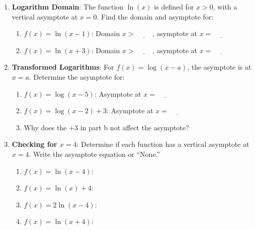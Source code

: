 \documentclass[12pt]{article}
\begin{document}
\begin{enumerate}[label=2.\arabic*]
    \item \textbf{Logarithm Domain}: The function \( \ln(x) \) is defined for \( x > 0 \), with a vertical asymptote at \( x = 0 \). Find the domain and asymptote for:
    \begin{enumerate}[label=\alph*)]
        \item \( f(x) = \ln(x - 1) \): Domain \( x > \underline{\hspace{1cm}} \), asymptote at \( x = \underline{\hspace{1cm}} \)
        \item \( f(x) = \ln(x + 3) \): Domain \( x > \underline{\hspace{1cm}} \), asymptote at \( x = \underline{\hspace{1cm}} \)
    \end{enumerate}
    \item \textbf{Transformed Logarithms}: For \( f(x) = \log(x - a) \), the asymptote is at \( x = a \). Determine the asymptote for:
    \begin{enumerate}[label=\alph*)]
        \item \( f(x) = \log(x - 5) \): Asymptote at \( x = \underline{\hspace{1cm}} \)
        \item \( f(x) = \log(x - 2) + 3 \): Asymptote at \( x = \underline{\hspace{1cm}} \)
        \item Why does the \( +3 \) in part b not affect the asymptote? \underline{\hspace{6cm}}
    \end{enumerate}
    \item \textbf{Checking for \( x = 4 \)}: Determine if each function has a vertical asymptote at \( x = 4 \). Write the asymptote equation or “None.”
    \begin{enumerate}[label=\alph*)]
        \item \( f(x) = \ln(x - 4) \): \underline{\hspace{2cm}}
        \item \( f(x) = \ln(x) + 4 \): \underline{\hspace{2cm}}
        \item \( f(x) = 2 \ln(x - 4) \): \underline{\hspace{2cm}}
        \item \( f(x) = \ln(x + 4) \): \underline{\hspace{2cm}}
    \end{enumerate}

\end{enumerate}
\end{document}
